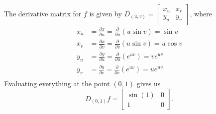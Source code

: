 \documentclass[letterpaper,12pt]{article}
\newcommand{\bbm}{\begin{bmatrix}}
\newcommand{\ebm}{\end{bmatrix}}
\begin{document}
\begin{enumerate}
The derivative matrix for $f$ is given by $D_{(u,v)} = \bbm x_u&x_v\\y_u&y_v\ebm$, where 
\begin{align*}
 x_u & = \frac{\partial x}{\partial u} = \frac{\partial }{\partial u}(u\sin v) = \sin v\\
 x_v & = \frac{\partial x}{\partial v} = \frac{\partial }{\partial v}(u\sin v) = u\cos v\\
 y_u & = \frac{\partial y}{\partial u} = \frac{\partial }{\partial u}(e^{uv}) = ve^{uv}\\
 y_v & = \frac{\partial y}{\partial v} = \frac{\partial }{\partial v}(e^{uv}) = ue^{uv}\\
\end{align*}
Evaluating everything at the point $(0,1)$ gives us
\[
 D_{(0,1)}f = \bbm \sin(1) & 0\\1&0\ebm.
\]

\end{enumerate}
\end{document}
